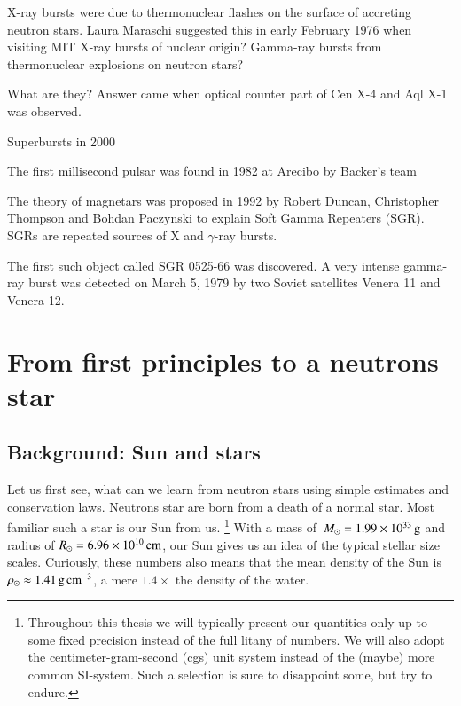 X-ray bursts were due to thermonuclear flashes on the surface of accreting neutron stars.
Laura Maraschi suggested this in early February 1976 when visiting MIT 
X-ray bursts of nuclear origin? \cite{MC77}
Gamma-ray bursts from thermonuclear explosions on neutron stars? \cite{WT76}



What are they? Answer came when optical counter part of Cen X-4 \cite{vPV80} and Aql X-1 \cite{TCB78} was observed.

Superbursts in 2000\cite{CHK00}

The first millisecond pulsar was found in 1982 at Arecibo by Backer’s team

The theory of magnetars was proposed in 1992 by Robert Duncan, Christopher Thompson and Bohdan Paczynski to explain Soft Gamma Repeaters (SGR). SGRs are repeated sources of X and $\gamma$-ray bursts. \cite{DT92}

The first such object called SGR 0525-66 was discovered.
A very intense gamma-ray burst was detected on March 5, 1979 by two Soviet satellites Venera 11 and Venera 12.\cite{MGI79}



\section{From first principles to a neutrons star}

\subsection{Background: Sun and stars}
Let us first see, what can we learn from neutron stars using simple estimates and conservation laws.
Neutrons star are born from a death of a normal star.%
Most familiar such a star is our Sun  \cm from us.%
\footnote{Throughout this thesis we will typically present our quantities only up to some fixed precision instead of the full litany of numbers.
We will also adopt the centimeter-gram-second (cgs) unit system instead of the (maybe) more common SI-system. 
Such a selection is sure to disappoint some, but try to endure.
}
With a mass of $\, M_{\odot} = 1.99 \times 10^{33} \, \mathrm{g}$ and radius of $R_{\odot} = 6.96 \times 10^{10} \, \mathrm{cm}$, our Sun gives us an idea of the typical stellar size scales.
Curiously, these numbers also means that the mean density of the Sun is $\rho_{\odot} \approx 1.41 \, \mathrm{g}\,\mathrm{cm}^{-3} $, a mere $1.4\times$ the density of the water.

